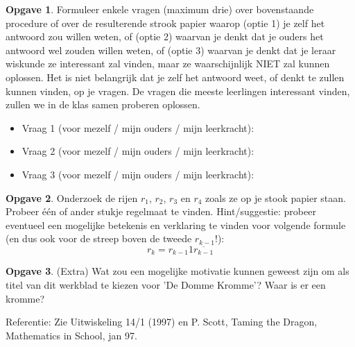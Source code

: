 \documentclass[12pt]{article}
\theoremstyle{definition}
\newtheorem{opgave}{Opgave}
\begin{document}
\begin{opgave}
	
Formuleer enkele vragen (maximum drie) over bovenstaande  procedure of over de resulterende strook papier waarop (optie 1) je zelf het antwoord zou willen weten, of (optie 2) waarvan je denkt dat je ouders het antwoord wel zouden willen weten, of (optie 3) waarvan je denkt dat je leraar wiskunde ze interessant zal vinden, maar ze waarschijnlijk NIET zal kunnen oplossen. Het is niet belangrijk dat je zelf het antwoord weet, of denkt te zullen kunnen vinden, op je vragen. De vragen die meeste leerlingen interessant vinden, zullen we in de klas samen proberen oplossen.

\begin{itemize}
	\item Vraag 1 (voor mezelf / mijn ouders / mijn leerkracht): 
	\vspace{2cm}
	\item Vraag 2 (voor mezelf / mijn ouders / mijn leerkracht): 
	\vspace{1cm}
	\item Vraag 3 (voor mezelf / mijn ouders / mijn leerkracht): 
	\vspace{1cm}

\end{itemize}
\end{opgave}

\begin{opgave}
Onderzoek de rijen $r_1$, $r_2$, $r_3$ en $r_4$ zoals ze op je stook papier staan. Probeer één of ander stukje regelmaat te vinden. Hint/suggestie: probeer eventueel een mogelijke betekenis en verklaring te vinden voor volgende formule (en dus ook voor de streep boven de tweede $r_{k-1}$!):
\[
r_k = r_{k-1}1\overline{r_{k-1}}
\] 

\end{opgave}
\begin{opgave} (Extra) Wat zou een mogelijke motivatie kunnen geweest zijn om als titel van dit werkblad te kiezen voor 'De Domme Kromme'? Waar is er een kromme? 
\end{opgave}
{
\footnotesize
Referentie: Zie Uitwiskeling 14/1 (1997) en P. Scott, Taming the Dragon, Mathematics in School, jan 97.
}
\end{document}
